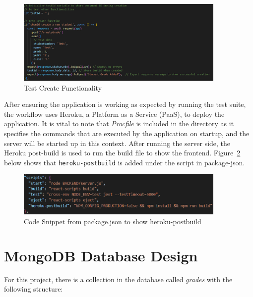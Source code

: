\begin{figure}[h!]
    \centering
    \includegraphics[width=0.9\textwidth]{images/test-create.png}
    \caption{Test Create Functionality}
    \label{image:test-create}
\end{figure}

After ensuring the application is working as expected by running the test suite, the workflow uses Heroku, a Platform as a Service (PaaS), to deploy the application. It is vital to note that \textit{Procfile} is included in the directory as it specifies the commands that are executed by the application on startup, and the server will be started up in this context. After running the server side, the Heroku post-build is used to run the build file to show the frontend. Figure~\ref{image:heroku-build} below shows that \texttt{heroku-postbuild} is added under the script in package-json.

\begin{figure}[h!]
    \centering
    \includegraphics[width=0.9\textwidth]{images/heroku-build.png}
    \caption{Code Snippet from package.json to show heroku-postbuild}
    \label{image:heroku-build}
\end{figure}

\section{MongoDB Database Design}

For this project, there is a collection in the database called \textit{grades} with the following structure:

